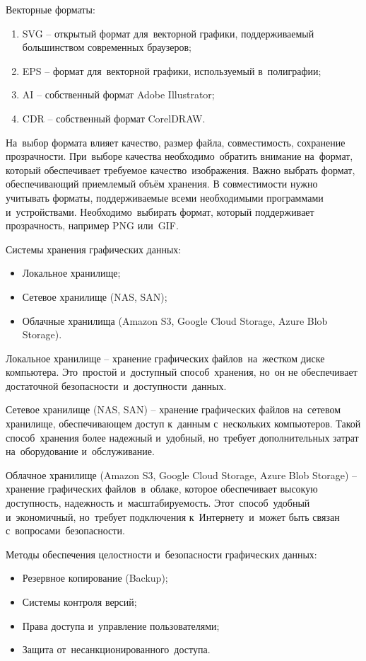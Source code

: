 \documentclass{ou}
\begin{document}
Векторные форматы:
\begin{enumerate}[leftmargin=0em, itemindent=3.75em, nosep, label=\arabic*)]
\item SVG -- открытый формат для~векторной графики, поддерживаемый большинством современных браузеров;
\item EPS -- формат для~векторной графики, используемый в~полиграфии;
\item AI -- собственный формат Adobe Illustrator;
\item CDR -- собственный формат CorelDRAW.
\end{enumerate}

На~выбор формата влияет качество, размер файла, совместимость, сохранение прозрачности. При~выборе качества необходимо~обратить внимание на~формат, который обеспечивает требуемое качество~изображения. Важно выбрать формат, обеспечивающий приемлемый объём хранения. В совместимости нужно учитывать форматы, поддерживаемые всеми необходимыми программами и~устройствами. Необходимо~выбирать формат, который поддерживает прозрачность, например PNG или~GIF.

Системы хранения графических данных:
\begin{itemize}[label=-, leftmargin=0em, itemindent=3.35em, nosep]
\item Локальное хранилище;
\item Сетевое хранилище (NAS, SAN);
\item Облачные хранилища (Amazon S3, Google Cloud Storage, Azure Blob Storage).
\end{itemize}

Локальное хранилище -- хранение графических файлов~на~жестком диске компьютера. Это~простой и~доступный способ~хранения, но~он не обеспечивает достаточной безопасности~и~доступности~данных.

Сетевое хранилище (NAS, SAN) -- хранение графических файлов на~сетевом хранилище, обеспечивающем доступ к~данным с~нескольких компьютеров. Такой способ~хранения более надежный и~удобный, но~требует дополнительных затрат на~оборудование и~обслуживание.

Облачное хранилище (Amazon S3, Google Cloud Storage, Azure Blob Storage) -- хранение графических файлов~в~облаке, которое обеспечивает высокую доступность, надежность и~масштабируемость. Этот~способ~удобный и~экономичный, но~требует подключения к~Интернету~и~может быть связан с~вопросами~безопасности.

Методы обеспечения целостности и~безопасности графических данных:
\begin{itemize}[label=-, leftmargin=0em, itemindent=3.35em, nosep]
\item Резервное копирование (Backup);
\item Системы контроля версий;
\item Права доступа и~управление пользователями;
\item Защита от~несанкционированного~доступа.
\end{itemize}
\end{document}
